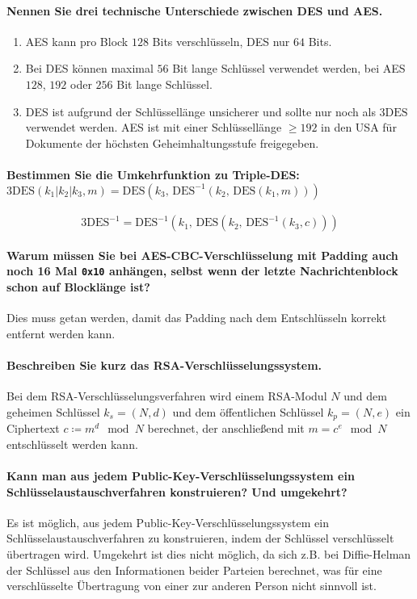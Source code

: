 		\paragraph{Nennen Sie drei technische Unterschiede zwischen DES und AES.}
			\begin{enumerate}
				\item AES kann pro Block \(128\) Bits verschlüsseln, DES nur \(64\) Bits.
				\item Bei DES können maximal \(56\) Bit lange Schlüssel verwendet werden, bei AES \(128\), \(192\) oder \(256\) Bit lange Schlüssel.
				\item DES ist aufgrund der Schlüssellänge unsicherer und sollte nur noch als \(\textrm{3DES}\) verwendet werden. AES ist mit einer Schlüssellänge \( \geq 192 \) in den USA für Dokumente der höchsten Geheimhaltungsstufe freigegeben.
			\end{enumerate}

		\paragraph{Bestimmen Sie die Umkehrfunktion zu Triple-DES: \(\textrm{3DES}(k_1 \vert k_2 \vert k_3, m) = \textrm{DES}(k_3, \,\textrm{DES}^{-1}(k_2, \,\textrm{DES}(k_1, m)))\)}
			\begin{equation*}
				\textrm{3DES}^{-1} = \textrm{DES}^{-1}(k_1, \,\textrm{DES}(k_2, \,\textrm{DES}^{-1}(k_3, c)))
			\end{equation*}

		\paragraph{Warum müssen Sie bei AES-CBC-Verschlüsselung mit Padding auch noch 16 Mal \texttt{0x10} anhängen, selbst wenn der letzte Nachrichtenblock schon auf Blocklänge ist?}
			Dies muss getan werden, damit das Padding nach dem Entschlüsseln korrekt entfernt werden kann.

		\paragraph{Beschreiben Sie kurz das RSA-Verschlüsselungssystem.}
			Bei dem RSA-Verschlüsselungsverfahren wird einem RSA-Modul \(N\) und dem geheimen Schlüssel \(k_s = (N, d)\) und dem öffentlichen Schlüssel \(k_p = (N, e)\) ein Ciphertext \( c \coloneqq m^d \mod N \) berechnet, der anschließend mit \( m = c^e \mod N \) entschlüsselt werden kann.

		\paragraph{Kann man aus jedem Public-Key-Verschlüsselungssystem ein Schlüsselaustauschverfahren konstruieren? Und umgekehrt?}
			Es ist möglich, aus jedem Public-Key-Verschlüsselungssystem ein Schlüsselaustauschverfahren zu konstruieren, indem der Schlüssel verschlüsselt übertragen wird. Umgekehrt ist dies nicht möglich, da sich z.B. bei Diffie-Helman der Schlüssel aus den Informationen beider Parteien berechnet, was für eine verschlüsselte Übertragung von einer zur anderen Person nicht sinnvoll ist.

